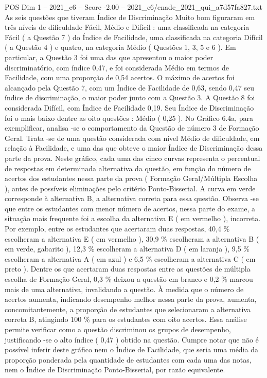 \begin{textsample}{POS Dim 1 – 2021\_c6 – Score -2.00 – 2021\_c6/enade\_2021\_qui\_a7d57fa827.txt}
As seis questões que tiveram Índice de Discriminação Muito bom figuraram em três níveis de dificuldade Fácil, Médio e Difícil : uma classificada na categoria Fácil ( a Questão 7 ) do Índice de Facilidade, uma classificada na categoria Difícil ( a Questão 4 ) e quatro, na categoria Médio ( Questões 1, 3, 5 e 6 ).
Em particular, a Questão 3 foi uma das que apresentou o maior poder discriminatório, com índice 0,47, e foi considerada Médio em termos de Facilidade, com uma proporção de 0,54 acertos.
O máximo de acertos foi alcançado pela Questão 7, com um Índice de Facilidade de 0,63, sendo 0,47 seu índice de discriminação, o maior poder junto com a Questão 3.
A Questão 8 foi considerada Difícil, com Índice de Facilidade 0,19.
Seu Índice de Discriminação foi o mais baixo dentre as oito questões : Médio ( 0,25 ).
No Gráfico 6.4a, para exemplificar, analisa -se o comportamento da Questão de número 3 de Formação Geral.
Trata -se de uma questão considerada com nível Médio de dificuldade, em relação à Facilidade, e uma das que obteve o maior Índice de Discriminação dessa parte da prova.
Neste gráfico, cada uma das cinco curvas representa o percentual de respostas em determinada alternativa da questão, em função do número de acertos dos estudantes nessa parte da prova ( Formação Geral/Múltipla Escolha ), antes de possíveis eliminações pelo critério Ponto-Bisserial.
A curva em verde corresponde à alternativa B, a alternativa correta para essa questão.
Observa -se que entre os estudantes com menor número de acertos, nessa parte do exame, a situação mais frequente foi a escolha da alternativa E ( em vermelho ), incorreta.
Por exemplo, entre os estudantes que acertaram duas respostas, 40,4 \% escolheram a alternativa E ( em vermelho ), 30,9 \% escolheram a alternativa B ( em verde, gabarito ), 12,3 \% escolheram a alternativa D ( em laranja ), 9,5 \% escolheram a alternativa A ( em azul ) e 6,5 \% escolheram a alternativa C ( em preto ).
Dentre os que acertaram duas respostas entre as questões de múltipla escolha de Formação Geral, 0,3 \% deixou a questão em branco e 0,2 \% marcou mais de uma alternativa, invalidando a questão.
À medida que o número de acertos aumenta, indicando desempenho melhor nessa parte da prova, aumenta, concomitantemente, a proporção de estudantes que selecionaram a alternativa correta B, atingindo 100 \% para os estudantes com oito acertos.
Essa análise permite verificar como a questão discriminou os grupos de desempenho, justificando -se o alto índice ( 0,47 ) obtido na questão.
Cumpre notar que não é possível inferir deste gráfico nem o Índice de Facilidade, que seria uma média da proporção ponderada pela quantidade de estudantes com cada uma das notas, nem o Índice de Discriminação Ponto-Bisserial, por razão equivalente.

\end{textsample}
